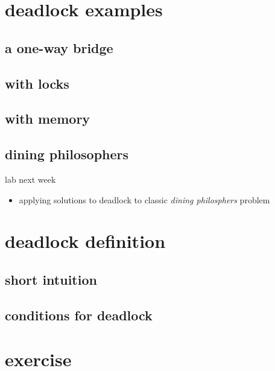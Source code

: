 

\section{deadlock examples}

\subsection{a one-way bridge}


\subsection{with locks}


\subsection{with memory}


\subsection{dining philosophers}
\begin{frame}{lab next week}
    \begin{itemize}
    \item applying solutions to deadlock to classic
    \textit{dining philosphers} problem
    \end{itemize}
\end{frame}

 
\section{deadlock definition}

\subsection{short intuition}



\subsection{conditions for deadlock}



\section{exercise}

